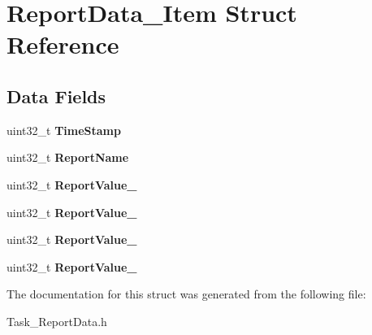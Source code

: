 \hypertarget{struct_report_data___item}{}\section{Report\+Data\+\_\+\+Item Struct Reference}
\label{struct_report_data___item}
\subsection*{Data Fields}
\begin{DoxyCompactItemize}
\item 
uint32\+\_\+t {\bfseries Time\+Stamp}\hypertarget{struct_report_data___item_ae5496f262c20f5fff03194f25526ce90}{}\label{struct_report_data___item_ae5496f262c20f5fff03194f25526ce90}

\item 
uint32\+\_\+t {\bfseries Report\+Name}\hypertarget{struct_report_data___item_ab4e59bcda44a33171b297da17d238915}{}\label{struct_report_data___item_ab4e59bcda44a33171b297da17d238915}

\item 
uint32\+\_\+t {\bfseries Report\+Value\+\_}\hypertarget{struct_report_data___item_a69327a9db23d5874a10d522c48edfc5b}{}\label{struct_report_data___item_a69327a9db23d5874a10d522c48edfc5b}

\item 
uint32\+\_\+t {\bfseries Report\+Value\+\_}\hypertarget{struct_report_data___item_a1acb01b269a43a0a98848057e5f51e39}{}\label{struct_report_data___item_a1acb01b269a43a0a98848057e5f51e39}

\item 
uint32\+\_\+t {\bfseries Report\+Value\+\_}\hypertarget{struct_report_data___item_a356dd7e7ea368d67f791e886ef3c75f1}{}\label{struct_report_data___item_a356dd7e7ea368d67f791e886ef3c75f1}

\item 
uint32\+\_\+t {\bfseries Report\+Value\+\_}\hypertarget{struct_report_data___item_af8bbe61d1e014d38a97e206b540981c6}{}\label{struct_report_data___item_af8bbe61d1e014d38a97e206b540981c6}

\end{DoxyCompactItemize}


The documentation for this struct was generated from the following file\+:\begin{DoxyCompactItemize}
\item 
Task\+\_\+\+Report\+Data.\+h\end{DoxyCompactItemize}
